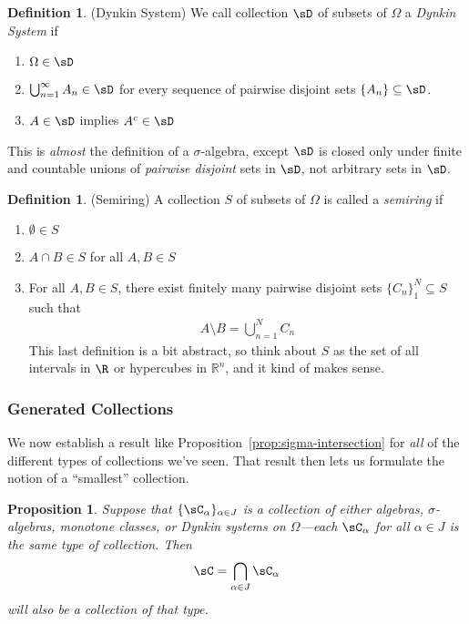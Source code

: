 \documentclass[12pt]{article}
\theoremstyle{plain}
\newtheorem{prop}[thm]{Proposition}
\theoremstyle{definition}
\newtheorem{defn}[thm]{Definition}
\theoremstyle{remark}
\newcommand{\Rn}{\mathbb{R}^n}
\newcommand{\ninf}{_{n=1}^\infty}
\newcommand{\nN}{_{n=1}^N}
\begin{document}
\begin{defn}(Dynkin System)
We call collection $\sD$ of subsets of $\Omega$ a
\emph{Dynkin System} if
\begin{enumerate}
  \item $\Omega\in\sD$
  \item $\bigcup\ninf A_n \in \sD$ for every sequence of pairwise
    disjoint sets $\{A_n\}\subseteq \sD$.
  \item $A\in\sD$ implies $A^c\in\sD$
\end{enumerate}
This is \emph{almost} the definition of a $\sigma$-algebra, except $\sD$
is closed only under finite and countable unions of \emph{pairwise
disjoint} sets in $\sD$, not arbitrary sets in $\sD$.
\end{defn}


\begin{defn}(Semiring)
A collection $S$ of subsets of $\Omega$ is called a \emph{semiring} if
\begin{enumerate}
  \item $\emptyset \in S$
  \item $A\cap B\in S$ for all $A,B\in S$
  \item For all $A,B\in S$, there exist finitely many pairwise disjoint
    sets $\{C_n\}_1^N\subseteq S$ such that
    \begin{align*}
      A \setminus B = \bigcup\nN C_n
    \end{align*}
    This last definition is a bit abstract, so think about $S$ as the
    set of all intervals in $\R$ or hypercubes in $\Rn$, and it kind of
    makes sense.
\end{enumerate}
\end{defn}

\clearpage
\subsubsection{Generated Collections}

We now establish a result like Proposition~\ref{prop:sigma-intersection}
for \emph{all} of the different types of collections we've seen. That
result then lets us formulate the notion of a ``smallest'' collection.

\begin{prop}
Suppose that $\{\sC_\alpha\}_{\alpha \in J}$ is a collection of either
algebras, $\sigma$-algebras, monotone classes, or Dynkin systems on
$\Omega$---each $\sC_\alpha$ for all $\alpha\in J$ is the same type of
collection. Then
\begin{align*}
  \sC = \bigcap_{\alpha \in J} \sC_\alpha
\end{align*}
will also be a collection of that type.
\end{prop}
\end{document}
